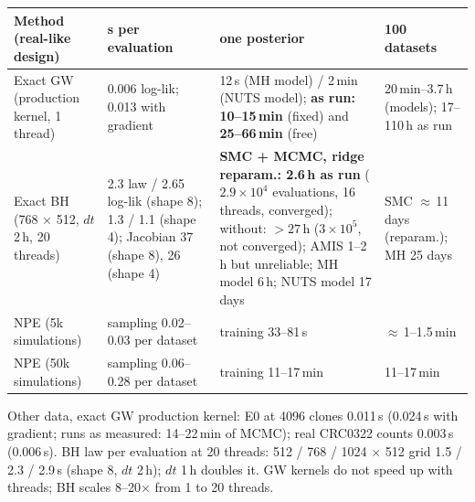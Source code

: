 \documentclass[10pt,a4paper]{article}
\newcommand{\code}[1]{\texttt{\detokenize{#1}}}
\newcommand{\blk}[1]{\par\needspace{5\baselineskip}\smallskip{\sffamily\bfseries\color{inkgray}#1}\par}
\newcommand{\Comment}{\blk{Comment}}
\begin{document}
\begin{center}\footnotesize\setlength{\tabcolsep}{3.5pt}
\begin{tabularx}{\linewidth}{@{}p{3.4cm}YYY@{}}\toprule
Method (real-like design) & s per evaluation & one posterior & 100 datasets \\\midrule
Exact GW (production kernel, 1 thread) & 0.006 log-lik; 0.013 with gradient & 12\,s (MH model) / 2\,min (NUTS model); \textbf{as run: 10--15\,min} (fixed) and \textbf{25--66\,min} (free) & 20\,min--3.7\,h (models); 17--110\,h as run \\
Exact BH (768 $\times$ 512, $dt$ 2\,h, 20 threads) & 2.3 law / 2.65 log-lik (shape 8); 1.3 / 1.1 (shape 4); Jacobian 37 (shape 8), 26 (shape 4) & \textbf{SMC + MCMC, ridge reparam.: 2.6\,h as run} ($2.9\times10^4$ evaluations, 16 threads, converged); without: $>27$\,h ($3\times10^5$, not converged); AMIS 1--2\,h but unreliable; MH model 6\,h; NUTS model 17 days & SMC $\approx$\,11 days (reparam.); MH 25 days \\
NPE \code{dev} (5k simulations) & sampling 0.02--0.03 per dataset & training 33--81\,s & $\approx$\,1--1.5\,min \\
NPE \code{full} (50k simulations) & sampling 0.06--0.28 per dataset & training 11--17\,min & 11--17\,min \\\bottomrule
\end{tabularx}

Other data, exact GW production kernel: E0 at 4096 clones 0.011\,s (0.024\,s with gradient; runs as measured: 14--22\,min of MCMC); real CRC0322 counts 0.003\,s (0.006\,s). BH law per evaluation at 20 threads: 512 / 768 / 1024 $\times$ 512 grid 1.5 / 2.3 / 2.9\,s (shape 8, $dt$ 2\,h); $dt$ 1\,h doubles it. GW kernels do not speed up with threads; BH scales 8--20$\times$ from 1 to 20 threads.
\end{center}
\Comment
\end{document}

